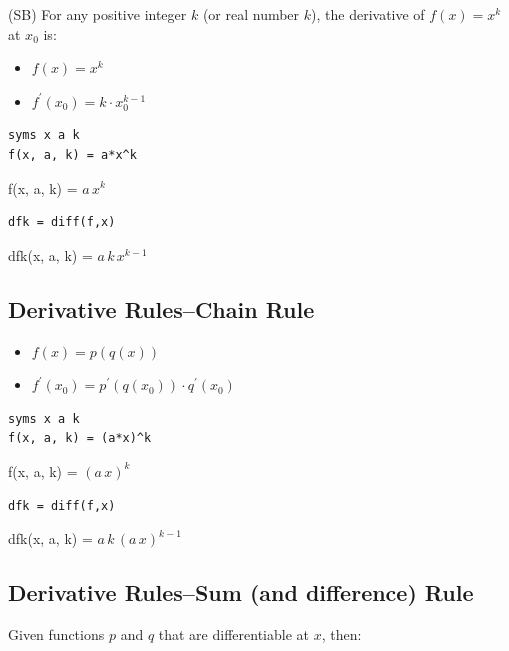 \documentclass[
]{book}
\begin{document}
(SB) For any positive integer \(k\) (or real number \(k\)), the derivative
of \(f(x)=x^k\) at \(x_0\) is:

\begin{itemize}
\item
  \(\displaystyle f(x)=x^k\)
\item
  \(\displaystyle f^{\prime } (x_0 )=k\cdot x_0^{k-1}\)
\end{itemize}

\begin{verbatim}
syms x a k
f(x, a, k) = a*x^k
\end{verbatim}

f(x, a, k) = \(\displaystyle a\,x^k\)

\begin{verbatim}
dfk = diff(f,x)
\end{verbatim}

dfk(x, a, k) = \(\displaystyle a\,k\,x^{k-1}\)

\hypertarget{derivative-ruleschain-rule}{%
\subsection{Derivative Rules--Chain Rule}\label{derivative-ruleschain-rule}}

\begin{itemize}
\item
  \(\displaystyle f(x)=p(q(x))\)
\item
  \(\displaystyle f^{\prime } (x_0 )=p^{\prime } (q(x_0 ))\cdot q^{\prime } (x_0 )\)
\end{itemize}

\begin{verbatim}
syms x a k
f(x, a, k) = (a*x)^k
\end{verbatim}

f(x, a, k) = \(\displaystyle {{\left(a\,x\right)}}^k\)

\begin{verbatim}
dfk = diff(f,x)
\end{verbatim}

dfk(x, a, k) = \(\displaystyle a\,k\,{{\left(a\,x\right)}}^{k-1}\)

\hypertarget{derivative-rulessum-and-difference-rule}{%
\subsection{Derivative Rules--Sum (and difference) Rule}\label{derivative-rulessum-and-difference-rule}}

Given functions \(p\) and \(q\) that are differentiable at \(x\), then:
\end{document}
